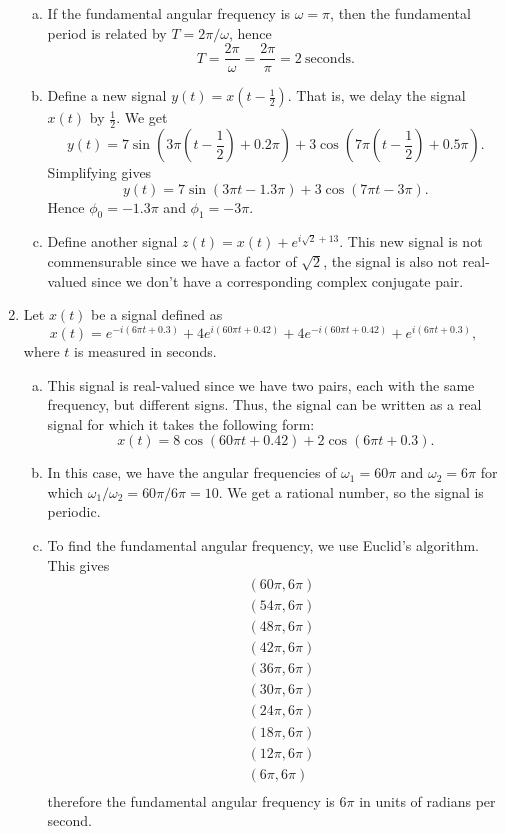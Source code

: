 \begin{enumerate}
\begin{enumerate}[a)]
\item If the fundamental angular frequency is $\omega=\pi$, then the fundamental period is related by $T=2\pi/\omega$, hence
$$T=\frac{2\pi}{\omega}=\frac{2\pi}{\pi}=2\ \text{seconds}.$$

\item Define a new signal $y(t)=x(t-\frac{1}{2})$. That is, we delay the signal $x(t)$ by $\frac{1}{2}$. We get
$$y(t)=7\sin(3\pi \left(t-\frac{1}{2}\right)+0.2\pi)+3\cos(7\pi \left(t-\frac{1}{2}\right)+0.5\pi).$$
Simplifying gives
$$y(t)=7\sin(3\pi t-1.3\pi)+3\cos(7\pi t-3\pi).$$
Hence $\phi_{0}=-1.3\pi$ and $\phi_{1}=-3\pi$. 

\item Define another signal $z(t)=x(t)+e^{i\sqrt{2}+13}$. This new signal is not commensurable since we have a factor of $\sqrt{2}$, the signal is also not real-valued since we don't have a corresponding complex conjugate pair. 
\end{enumerate}

\item Let $x(t)$ be a signal defined as
$$x(t)=e^{-i(6\pi t+0.3)}+4e^{i(60\pi t+0.42)}+4e^{-i(60\pi t+0.42)}+e^{i(6\pi t+0.3)},$$
where $t$ is measured in seconds. 
\begin{enumerate}[a)]
\item This signal is real-valued since we have two pairs, each with the same frequency, but different signs. Thus, the signal can be written as a real signal for which it takes the following form:
$$x(t)=8\cos(60\pi t+0.42)+2\cos(6\pi t+0.3).$$
\item In this case, we have the angular frequencies of $\omega_{1}=60\pi$ and $\omega_{2}=6\pi$ for which $\omega_{1}/\omega_{2}=60\pi/6\pi=10$. We get a rational number, so the signal is periodic. 
\item To find the fundamental angular frequency, we use Euclid's algorithm. This gives
\begin{align*}
    &(60\pi,6\pi) \\
    &(54\pi,6\pi) \\
    &(48\pi,6\pi) \\
    &(42\pi,6\pi) \\
    &(36\pi,6\pi) \\
    &(30\pi,6\pi) \\
    &(24\pi,6\pi) \\
    &(18\pi,6\pi) \\
    &(12\pi,6\pi) \\
    &(6\pi,6\pi) \\
\end{align*}
therefore the fundamental angular frequency is $6\pi$ in units of radians per second. 


\end{enumerate}
\end{enumerate}
